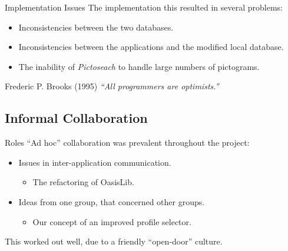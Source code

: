 \begin{frame}{Implementation Issues}
	The implementation this resulted in several problems:
	\begin{itemize}
		\item<1> Inconsistencies between the two databases.
		\item<2> Inconsistencies between the applications and the modified local database.
		\item<3> The inability of \textit{Pictoseach} to handle large numbers of pictograms.
	\end{itemize}
	\pause[4]
	\begin{block}{Frederic P. Brooks (1995)}
    	\textit{``All programmers are optimists.''}
   	\end{block}
\end{frame}


\subsection{Informal Collaboration}

\begin{frame}{Roles}
	``Ad hoc'' collaboration was prevalent throughout the project:
	\begin{itemize}
		\item<1> Issues in inter-application communication.
		\begin{itemize}
			\item<1> The refactoring of OasisLib.
		\end{itemize}
		\item<2> Ideas from one group, that concerned other groups.
		\begin{itemize}
			\item<2> Our concept of an improved profile selector.
		\end{itemize}
	\end{itemize}
	\vspace{\baselineskip}
	\pause[3]
	This worked out well, due to a friendly ``open-door'' culture.
\end{frame}

